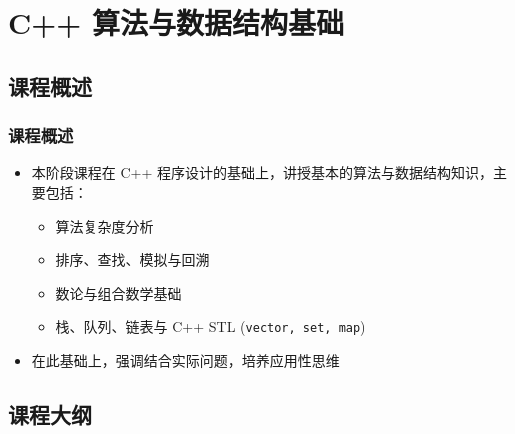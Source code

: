 \section{C++ 算法与数据结构基础}

\subsection{课程概述}

\begin{frame}[fragile]
    \frametitle{课程概述}

    \begin{itemize}[<+->]
        \item 本阶段课程在 C++ 程序设计的基础上，讲授基本的算法与数据结构知识，主要包括：

            \begin{itemize}
                \item 算法复杂度分析
                \item 排序、查找、模拟与回溯
                \item 数论与组合数学基础
                \item 栈、队列、链表与 C++ STL (\lstinline|vector, set, map|)
            \end{itemize}

        \item 在此基础上，强调结合实际问题，培养应用性思维
    \end{itemize}
\end{frame}

\subsection{课程大纲}

